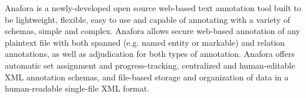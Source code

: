 Anafora is a newly-developed open source web-based text annotation tool built to be lightweight, flexible, easy to use and capable of annotating with a
 variety of schemas, simple and complex. Anafora allows secure web-based
 annotation of any plaintext file with both spanned (e.g. named entity or
 markable) and relation annotations, as well as adjudication for both types of
 annotation. Anafora offers automatic set assignment and progress-tracking,
 centralized and human-editable XML annotation schemas, and file-based storage
 and organization of data in a human-readable single-file XML format.

